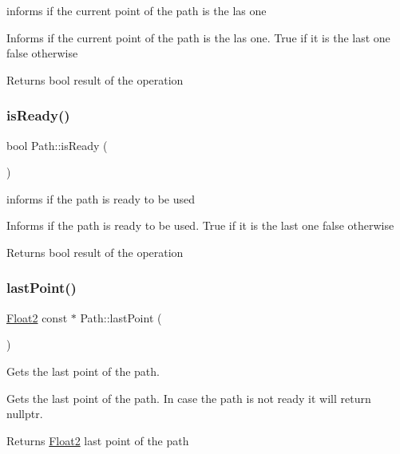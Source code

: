 informs if the current point of the path is the las one 

Informs if the current point of the path is the las one. True if it is the last one false otherwise

\begin{DoxyReturn}{Returns}
bool result of the operation 
\end{DoxyReturn}
\mbox{\label{class_path_a738ebaf508fc4a35dd5a5f5f8c84e39f}} 
\subsubsection{\texorpdfstring{is\+Ready()}{isReady()}}
{\footnotesize\ttfamily bool Path\+::is\+Ready (\begin{DoxyParamCaption}{ }\end{DoxyParamCaption})}



informs if the path is ready to be used 

Informs if the path is ready to be used. True if it is the last one false otherwise

\begin{DoxyReturn}{Returns}
bool result of the operation 
\end{DoxyReturn}
\mbox{\label{class_path_a2ef24ce0bf3b3468ecbb4a6e0efdebfd}} 
\subsubsection{\texorpdfstring{last\+Point()}{lastPoint()}}
{\footnotesize\ttfamily \mbox{\hyperlink{class_float2}{Float2}} const  $\ast$ Path\+::last\+Point (\begin{DoxyParamCaption}{ }\end{DoxyParamCaption})}



Gets the last point of the path. 

Gets the last point of the path. In case the path is not ready it will return nullptr.

\begin{DoxyReturn}{Returns}
\mbox{\hyperlink{class_float2}{Float2}} last point of the path 
\end{DoxyReturn}
\mbox{\label{class_path_a17f70e35a36c29650f571c59a237b0e5}} 
